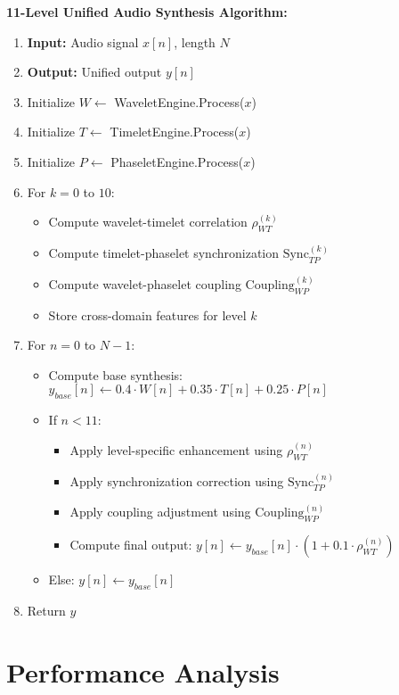 \textbf{11-Level Unified Audio Synthesis Algorithm:}
\begin{enumerate}
\item \textbf{Input:} Audio signal $x[n]$, length $N$
\item \textbf{Output:} Unified output $y[n]$
\item Initialize $W \leftarrow$ WaveletEngine.Process($x$)
\item Initialize $T \leftarrow$ TimeletEngine.Process($x$)
\item Initialize $P \leftarrow$ PhaseletEngine.Process($x$)
\item For $k = 0$ to $10$:
    \begin{itemize}
    \item Compute wavelet-timelet correlation $\rho_{WT}^{(k)}$
    \item Compute timelet-phaselet synchronization $\text{Sync}_{TP}^{(k)}$
    \item Compute wavelet-phaselet coupling $\text{Coupling}_{WP}^{(k)}$
    \item Store cross-domain features for level $k$
    \end{itemize}
\item For $n = 0$ to $N-1$:
    \begin{itemize}
    \item Compute base synthesis: $y_{base}[n] \leftarrow 0.4 \cdot W[n] + 0.35 \cdot T[n] + 0.25 \cdot P[n]$
    \item If $n < 11$:
        \begin{itemize}
        \item Apply level-specific enhancement using $\rho_{WT}^{(n)}$
        \item Apply synchronization correction using $\text{Sync}_{TP}^{(n)}$
        \item Apply coupling adjustment using $\text{Coupling}_{WP}^{(n)}$
        \item Compute final output: $y[n] \leftarrow y_{base}[n] \cdot (1 + 0.1 \cdot \rho_{WT}^{(n)})$
        \end{itemize}
    \item Else: $y[n] \leftarrow y_{base}[n]$
    \end{itemize}
\item Return $y$
\end{enumerate}

\section{Performance Analysis}

